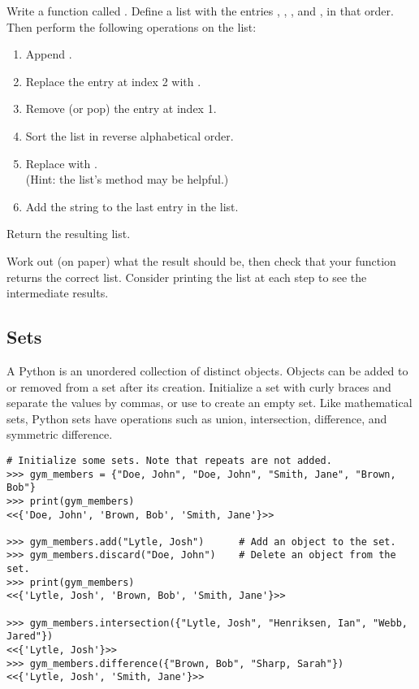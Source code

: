 \begin{problem} %
Write a function called .
Define a list with the entries , , , and , in that order.
Then perform the following operations on the list:
\begin{enumerate}
\item Append .
\item Replace the entry at index 2 with .
\item Remove (or pop) the entry at index 1.
\item Sort the list in reverse alphabetical order.
\item Replace  with .
\\(Hint: the list's  method may be helpful.)
\item Add the string  to the last entry in the list.
\end{enumerate}
Return the resulting list.

Work out (on paper) what the result should be, then check that your function returns the correct list.
Consider printing the list at each step to see the intermediate results.
\end{problem}

\subsection*{Sets} %

A Python  is an unordered collection of distinct objects.
Objects can be added to or removed from a set after its creation.
Initialize a set with curly braces \li{\{ \}} and separate the values by commas, or use  to create an empty set.
Like mathematical sets, Python sets have operations such as union, intersection,
difference, and symmetric difference.

\begin{lstlisting}
# Initialize some sets. Note that repeats are not added.
>>> gym_members = {"Doe, John", "Doe, John", "Smith, Jane", "Brown, Bob"}
>>> print(gym_members)
<<{'Doe, John', 'Brown, Bob', 'Smith, Jane'}>>

>>> gym_members.add("Lytle, Josh")      # Add an object to the set.
>>> gym_members.discard("Doe, John")    # Delete an object from the set.
>>> print(gym_members)
<<{'Lytle, Josh', 'Brown, Bob', 'Smith, Jane'}>>

>>> gym_members.intersection({"Lytle, Josh", "Henriksen, Ian", "Webb, Jared"})
<<{'Lytle, Josh'}>>
>>> gym_members.difference({"Brown, Bob", "Sharp, Sarah"})
<<{'Lytle, Josh', 'Smith, Jane'}>>
\end{lstlisting}

